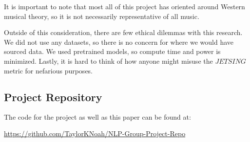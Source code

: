\documentclass[11pt]{article}
\begin{document}
It is important to note that most all of this project has oriented around Western musical theory,
so it is not necessarily representative of all music.

Outside of this consideration, there are few ethical dilemmas with this research.
We did not use any datasets, so there is no concern for where we would have sourced data.
We used pretrained models, so compute time and power is minimized.
Lastly, it is hard to think of how anyone might misuse the $JETSING$ metric for nefarious purposes. 

\subsection{Project Repository}
The code for the project as well as this paper can be found at:

\url{https://github.com/TaylorKNoah/NLP-Group-Project-Repo}




\nocite{huang2018music, kotecha2018generating, vaswani2017attention, zhao2020verticalhorizontal, performance-rnn-2017, musicVAE}
\end{document}
